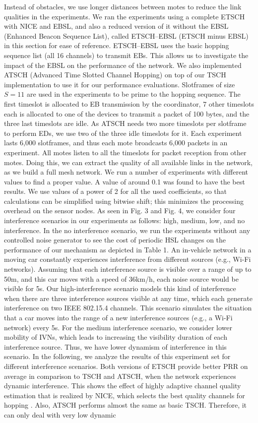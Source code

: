 \documentclass[acmsmall, authorversion]{acmart}
\begin{document}
Instead of obstacles, we use longer distances between motes to reduce the link qualities in the experiments. We ran the experiments using a complete ETSCH with NICE and EBSL, and also a reduced version of it without the EBSL (Enhanced Beacon Sequence List), called ETSCH–EBSL (ETSCH minus EBSL) in this section for ease of reference. ETSCH–EBSL uses the basic hopping sequence list (all 16 channels) to transmit EBs. This allows us to investigate the impact of the EBSL on the performance of the network. We also implemented ATSCH (Advanced Time Slotted Channel Hopping) \cite{de} on top of our TSCH implementation to use it for our performance evaluations. Slotframes of size $S=11$ are used in the experiments to be prime to the hopping sequence. The first timeslot is allocated to EB transmission by the coordinator, 7 other timeslots each is allocated to one of the devices to transmit a packet of 100 bytes, and the three last timeslots are idle. As ATSCH needs two more timeslots per slotframe to perform EDs, we use two of the three idle timeslots for it. Each experiment lasts 6,000 slotframes, and thus each mote broadcasts 6,000 packets in an experiment. All motes listen to all the timeslots for packet reception from other motes. Doing this, we can extract the quality of all available links in the network, as we build a full mesh network. We run a number of experiments with different values to find a proper value. A value of around 0.1 was found to have the best results. We use values of a power of 2 for all the used coefficients, so that calculations can be simplified using bitwise shift; this minimizes the processing overhead on the sensor nodes. As seen in Fig. 3 and Fig. 4, we consider four interference scenarios in our experiments as follows: high, medium, low, and no interference. In the no interference scenario, we run the experiments without any controlled noise generator to see the cost of periodic HSL changes on the performance of our mechanism as depicted in Table 1. An in-vehicle network in a moving car constantly experiences interference from different sources (e.g., Wi-Fi networks). Assuming that each interference source is visible over a range of up to 50m, and this car moves with a speed of 36km/h, each noise source would be visible for 5s. Our high-interference scenario models this kind of interference when there are three interference sources visible at any time, which each generate interference on two IEEE 802.15.4 channels. This scenario simulates the situation that a car moves into the range of a new interference sources (e.g., a Wi-Fi network) every 5s. For the medium interference scenario, we consider lower mobility of IVNs, which leads to increasing the visibility duration of each interference source. Thus, we have lower dynamism of interference in this scenario. In the following, we analyze the results of this experiment set for different interference scenarios. Both versions of ETSCH provide better PRR on average in comparison to TSCH and ATSCH, when the network experiences dynamic interference. This shows the effect of highly adaptive channel quality estimation that is realized by NICE, which selects the best quality channels for hopping \cite{gomes}. Also, ATSCH performs almost the same as basic TSCH. Therefore, it can only deal with very low dynamic 
\end{document}
